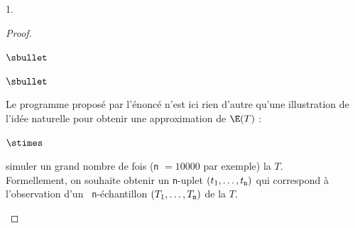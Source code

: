 \documentclass[11pt]{article}%
\begin{document}
\begin{noliste}{1.}
\begin{proof}
\begin{noliste}{$\sbullet$}
            
    \end{noliste}
    \begin{remarkL}{.98}
      \begin{noliste}{$\sbullet$}
      \item Le programme proposé par l'énoncé n'est ici rien d'autre
        qu'une illustration de l'idée naturelle pour obtenir une
        approximation de $\E(T)$ :
        \begin{noliste}{$\stimes$}
        \item simuler un grand nombre de fois ({\tt n} $=10000$ par
          exemple) la \var $T$.\\
          Formellement, on souhaite obtenir un {\tt n}-uplet $(t_1,
          \ldots, t_{\tt n})$ qui correspond à l'observation d'un {\tt
            n}-échantillon $(T_1, \ldots, T_{\tt n})$ de la \var $T$.
          

\end{noliste}
\end{noliste}
\end{remarkL}
\end{proof}
\end{noliste}
\end{document}
